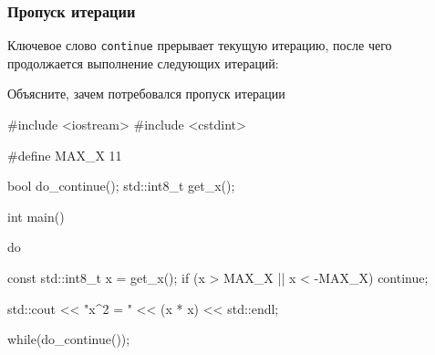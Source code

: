 \documentclass[compress, 8pt]{beamer}
\begin{document}
\begin{frame}[fragile]

    \frametitle{Пропуск итерации}

    \hfill \break

    Ключевое слово \verb|continue| прерывает текущую итерацию,
    после чего продолжается выполнение следующих итераций:

    \begin{task}
        Объясните, зачем потребовался пропуск итерации
    \end{task}

    \begin{myinplacelisting}[%
        minted language=cpp,
        minted options={
            fontsize=\normalsize,
            breaklines,
            breakanywhere,
            linenos,
            escapeinside=??,
            numbersep=2pt
        },
    ]
#include <iostream>
#include <cstdint>

#define MAX_X 11

bool do_continue();
std::int8_t get_x();

int main() {
    do {
        const std::int8_t x = get_x();
        if (x > MAX_X || x < -MAX_X) {
            continue;
        }

        std::cout << "x^2 = " << (x * x) << std::endl;
    } while(do_continue());
}
    \end{myinplacelisting}

\end{frame}
\end{document}
